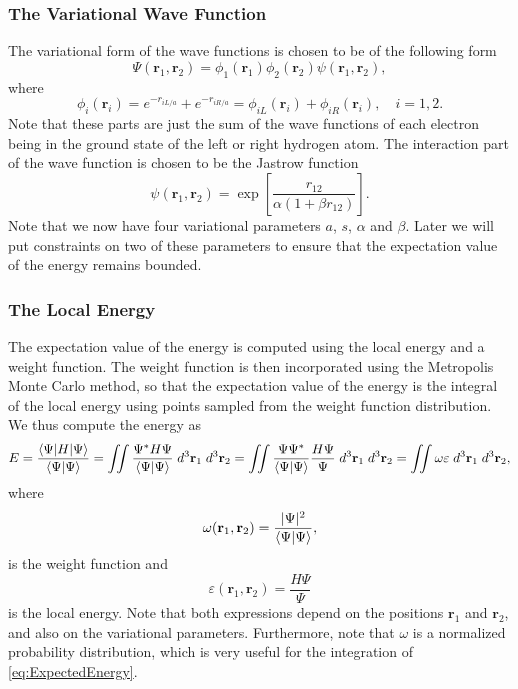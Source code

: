 \documentclass[twoside]{article}
\newcommand{\bfr}{\ensuremath{\mathbf{r}}}
\begin{document}
\subsubsection*{The Variational Wave Function}
The variational form of the wave functions is chosen to be of the following form
\begin{equation}
\Psi(\bfr_1,\bfr_2) = \phi_1(\bfr_1)\phi_2(\bfr_2)\psi(\bfr_1,\bfr_2),
\end{equation}
where 
\begin{equation}
\phi_i(\bfr_i) = e^{-r_{iL/a}} + e^{-r_{iR/a}} = \phi_{iL}(\bfr_i) + \phi_{iR}(\bfr_i), \quad i=1,2.
\end{equation}
Note that these parts are just the sum of the wave functions of each electron being in the ground state of the left or right hydrogen atom. The interaction part of the wave function is chosen to be the Jastrow function
\begin{equation}
\psi(\bfr_1,\bfr_2) = \exp\left[ \frac{r_{12}}{\alpha(1+\beta r_{12})} \right].
\end{equation}
Note that we now have four variational parameters $a$, $s$, $\alpha$ and $\beta$. Later we will put constraints on two of these parameters to ensure that the expectation value of the energy remains bounded.

\subsubsection*{The Local Energy}
The expectation value of the energy is computed using the local energy and a weight function. The weight function is then incorporated using the Metropolis Monte Carlo method, so that the expectation value of the energy is the integral of the local energy using points sampled from the weight function distribution. We thus compute the energy as
\begin{equation}
E = \frac{\braket{\Psi|H|\Psi}}{\braket{\Psi|\Psi}} = 
\iint \frac{\Psi^* H \Psi}{\braket{\Psi|\Psi}}  \; d^3\bfr_1 \; d^3\bfr_2 = 
\iint \frac{\Psi\Psi^*}{\braket{\Psi|\Psi}} \frac{H \Psi}{\Psi} \; d^3\bfr_1 \; d^3\bfr_2 = \iint \omega \varepsilon \; d^3\bfr_1 \; d^3\bfr_2,
\label{eq:ExpectedEnergy}
\end{equation} 
where
\begin{equation}
\omega(\bfr_1,\bfr_2) = \frac{|\Psi|^2}{\braket{\Psi|\Psi}},
\end{equation}
is the weight function and
\begin{equation}
\varepsilon(\bfr_1,\bfr_2) = \frac{H \Psi}{\Psi}
\label{eq:LocalEnergy}
\end{equation}
is the local energy. Note that both expressions depend on the positions $\bfr_1$ and $\bfr_2$, and also on the variational parameters. Furthermore, note that $\omega$ is a normalized probability distribution, which is very useful for the integration of \eqref{eq:ExpectedEnergy}.
\end{document}

